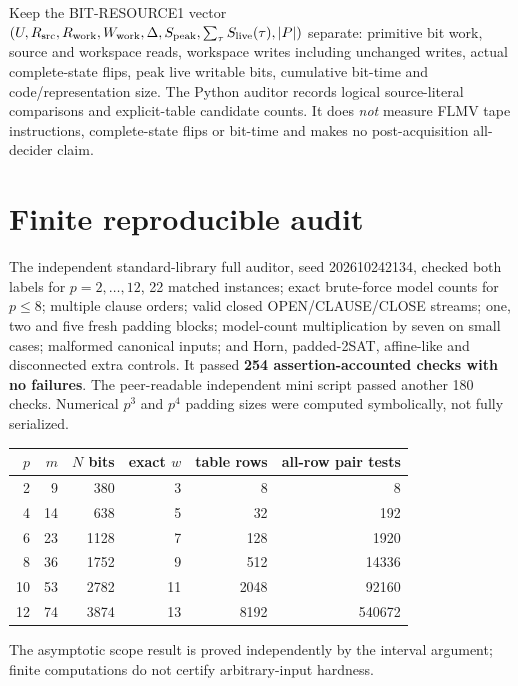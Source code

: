 \documentclass[11pt]{article}
\begin{document}
Keep the BIT-RESOURCE1 vector $(U,R_{\rm src},R_{\rm work},W_{\rm work},\Delta,S_{\rm peak},\sum_\tau S_{\rm live}(\tau),|P|)$ separate: primitive bit work, source and workspace reads, workspace writes including unchanged writes, actual complete-state flips, peak live writable bits, cumulative bit-time and code/representation size. The Python auditor records logical source-literal comparisons and explicit-table candidate counts. It does \emph{not} measure FLMV tape instructions, complete-state flips or bit-time and makes no post-acquisition all-decider claim.

\section{Finite reproducible audit}
The independent standard-library full auditor, seed 202610242134, checked both labels for $p=2,\ldots,12$, 22 matched instances; exact brute-force model counts for $p\le8$; multiple clause orders; valid closed OPEN/CLAUSE/CLOSE streams; one, two and five fresh padding blocks; model-count multiplication by seven on small cases; malformed canonical inputs; and Horn, padded-2SAT, affine-like and disconnected extra controls. It passed \textbf{254 assertion-accounted checks with no failures}. The peer-readable independent mini script passed another 180 checks. Numerical $p^3$ and $p^4$ padding sizes were computed symbolically, not fully serialized.
\begin{center}\small
\begin{tabular}{rrrrrr}
\toprule
$p$ & $m$ & $N$ bits & exact $w$ & table rows & all-row pair tests\\
\midrule
2&9&380&3&8&8\\
4&14&638&5&32&192\\
6&23&1128&7&128&1920\\
8&36&1752&9&512&14336\\
10&53&2782&11&2048&92160\\
12&74&3874&13&8192&540672\\
\bottomrule
\end{tabular}
\end{center}
The asymptotic scope result is proved independently by the interval argument; finite computations do not certify arbitrary-input hardness.
\end{document}

